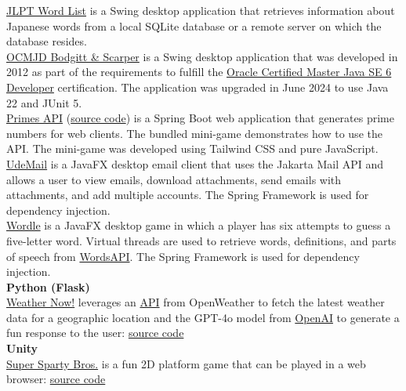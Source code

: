 \documentclass[10pt]{res} %
\begin{document}
\begin{resume}
 \href{https://bitbucket.org/bjpeterdelacruz/jlpt-word-list}{\color{blue}JLPT Word List} is a Swing desktop application that retrieves information about Japanese words from a local SQLite database or a remote server on which the database resides. \\
 \href{https://bitbucket.org/bjpeterdelacruz/ocmjd-bodgitt-scarper}{\color{blue}OCMJD Bodgitt \& Scarper} is a Swing desktop application that was developed in 2012 as part of the requirements to fulfill the \href{https://www.credly.com/badges/7cb3e075-f9d4-47ae-a5d3-9ba4539f9ece}{\color{blue}Oracle Certified Master Java SE 6 Developer} certification. The application was upgraded in June 2024 to use Java 22 and JUnit 5. \\
 \href{https://primes-api-web-app.azurewebsites.net}{\color{blue}Primes API} (\href{https://bitbucket.org/bjpeterdelacruz/primes-api}{\color{blue}source code}) is a Spring Boot web application that generates prime numbers for web clients. The bundled mini-game demonstrates how to use the API. The mini-game was developed using Tailwind CSS and pure JavaScript. \\
 \href{https://bitbucket.org/bjpeterdelacruz/udemail}{\color{blue}UdeMail} is a JavaFX desktop email client that uses the Jakarta Mail API and allows a user to view emails, download attachments, send emails with attachments, and add multiple accounts. The Spring Framework is used for dependency injection. \\
 \href{https://bitbucket.org/bjpeterdelacruz/wordle}{\color{blue}Wordle} is a JavaFX desktop game in which a player has six attempts to guess a five-letter word. Virtual threads are used to retrieve words, definitions, and parts of speech from \href{https://rapidapi.com/dpventures/api/wordsapi}{\color{blue}WordsAPI}. The Spring Framework is used for dependency injection. \\
{\bf Python (Flask)} \\
 \href{https://weather-now-knartlettq-ul.a.run.app}{\color{blue}Weather Now!} leverages an \href{https://openweathermap.org/api}{\color{blue}API} from OpenWeather to fetch the latest weather data for a geographic location and the GPT-4o model from \href{https://openai.com/index/hello-gpt-4o}{\color{blue}OpenAI} to generate a fun response to the user: \href{https://bitbucket.org/bjpeterdelacruz/weather-now}{\color{blue}source code} \\
{\bf Unity} \\
 \href{https://bjdelacruz.dev/games/SuperSpartyBros/2.1/WebGL/index.html}{\color{blue}Super Sparty Bros.} is a fun 2D platform game that can be played in a web browser: \href{https://bitbucket.org/bjpeterdelacruz/super-sparty-bros.}{\color{blue}source code}


\end{resume}
\end{document}
